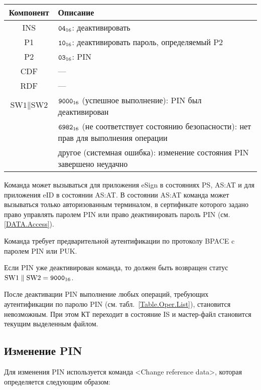\noindent
\begin{tabular}{|c|p{14cm}|}
\hline
Компонент & Описание \\
\hline
\hline
INS & $\texttt{04}_{16}$: деактивировать \\
\hline
P1 & $\texttt{10}_{16}$: деактивировать пароль, определяемый P2\\
\hline
P2 & $\texttt{03}_{16}$: PIN \\
\hline
CDF &  --- \\
\hline \hline
RDF &  --- \\
\hline
$\text{SW1} \parallel \text{SW2}$ & $\texttt{9000}_{16}$ 
(успешное выполнение): PIN был деактивирован\\ 
 & $\texttt{6982}_{16}$ (не соответствует состоянию безопасности): 
нет прав для выполнения операции\\
 & другое (системная ошибка): изменение состояния PIN завершено неудачно\\
\hline
\end{tabular}

Команда может вызываться для приложения eSign в состояниях 
PS, AS:AT и для приложения eID в состоянии AS:AT. 
В состоянии AS:AT команда может вызываться 
только авторизованным терминалом,
в сертификате которого задано право 
управлять паролем PIN или право деактивировать 
пароль PIN (см. \ref{DATA.Access}).

Команда требует предварительной аутентификации по 
протоколу BPACE c паролем PIN или PUK. 

Если PIN уже деактивирован команда, то должен быть возвращен 
статус $\text{SW1} \parallel \text{SW2} = \texttt{9000}_{16}$.

После деактивации PIN выполнение любых операций, 
требующих аутентификации по паролю PIN (см. табл.~\ref{Table.Oper.List}), 
становится невозможным. 
При этом КТ переходит в состояние IS и мастер-файл 
становится текущим выделенным файлом. 


\subsection{Изменение PIN}
\label{Oper.Descr.ChangePIN}

Для изменения PIN используется команда <Change reference data>,
которая определяется следующим образом:

